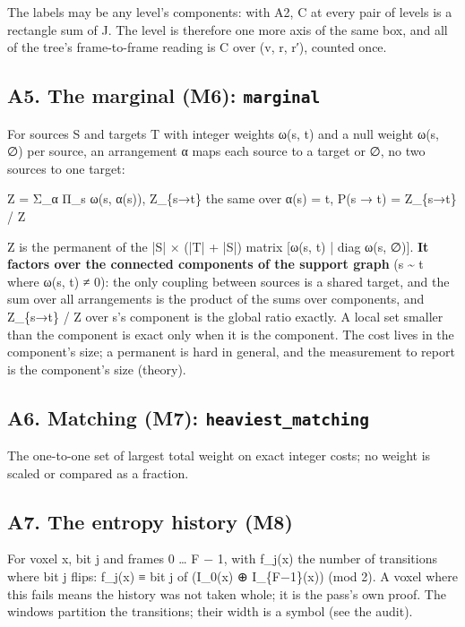 The labels may be any level's components: with A2, C at every pair of levels is a rectangle sum of J. The level is therefore one more axis of the same box, and all of the tree's frame-to-frame reading is C over (v, r, r′), counted once.

\subsection{\texorpdfstring{A5. The marginal (M6): \texttt{marginal}}{A5. The marginal (M6): marginal}}

For sources S and targets T with integer weights ω(s, t) and a null weight ω(s, ∅) per source, an arrangement α maps each source to a target or ∅, no two sources to one target:

Z = Σ\_\allowbreak{}α Π\_\allowbreak{}s ω(s, α(s)),  Z\_\allowbreak{}\{s→t\} the same over α(s) = t,  P(s → t) = Z\_\allowbreak{}\{s→t\} / Z

Z is the permanent of the |S| × (|T| + |S|) matrix [ω(s, t) | diag ω(s, ∅)]. \textbf{It factors over the connected components of the support graph} (s \textasciitilde{} t where ω(s, t) ≠ 0): the only coupling between sources is a shared target, and the sum over all arrangements is the product of the sums over components, and Z\_\allowbreak{}\{s→t\} / Z over s's component is the global ratio exactly. A local set smaller than the component is exact only when it is the component. The cost lives in the component's size; a permanent is hard in general, and the measurement to report is the component's size (theory).

\subsection{\texorpdfstring{A6. Matching (M7): \texttt{heaviest\_\allowbreak{}matching}}{A6. Matching (M7): heaviest\_matching}}

The one-to-one set of largest total weight on exact integer costs; no weight is scaled or compared as a fraction.

\subsection{\texorpdfstring{A7. The entropy history (M8)}{A7. The entropy history (M8)}}

For voxel x, bit j and frames 0 … F − 1, with f\_\allowbreak{}j(x) the number of transitions where bit j flips: f\_\allowbreak{}j(x) ≡ bit j of (I\_\allowbreak{}0(x) ⊕ I\_\allowbreak{}\{F−1\}(x)) (mod 2). A voxel where this fails means the history was not taken whole; it is the pass's own proof. The windows partition the transitions; their width is a symbol (see the audit).

